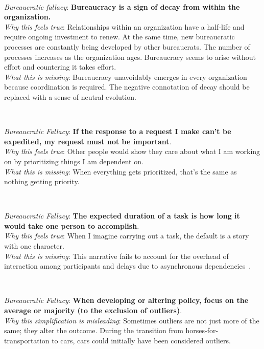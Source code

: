 \ \\
\begin{samepage}
\textit{Bureaucratic fallacy}: \textbf{Bureaucracy is a sign of decay from within the organization.} \\
\textit{Why this feels true}: Relationships within an organization have a half-life and require ongoing investment to renew. At the same time, new bureaucratic processes are constantly being developed by other bureaucrats. The number of processes increases as the organization ages. Bureaucracy seems to arise without effort and countering it takes effort.  \\
\textit{What this is missing}: Bureaucracy unavoidably emerges in every organization because coordination is required. The negative connotation of decay should be replaced with a sense of neutral evolution.
\end{samepage}

\ \\
\begin{samepage}
\textit{Bureaucratic Fallacy}: \textbf{If the response to a request I make can't be expedited, my request must not be important}.  \\
\textit{Why this feels true}: Other people would show they care about what I am working on by prioritizing things I am dependent on.\\
\textit{What this is missing}: When everything gets prioritized, that's the same as nothing getting priority.
\end{samepage}

\ \\
\begin{samepage}
\textit{Bureaucratic Fallacy}: \textbf{The expected duration of a task is how long it would take one person to accomplish}.  \\
\textit{Why this feels true}: When I imagine carrying out a task, the default is a story with one character. \\
\textit{What this is missing}: This narrative fails to account for the overhead of interaction among participants and delays due to asynchronous dependencies~\cite{1975_brooks}.
\end{samepage}

\ \\
\begin{samepage}
\textit{Bureaucratic Fallacy}: \textbf{When developing or altering policy, focus on the average or majority (to the exclusion of outliers)}. \\
\textit{Why this simplification is misleading}: Sometimes outliers are not just more of the same; they alter the outcome. During the transition from horses-for-transportation to cars, cars could initially have been considered outliers. 
\end{samepage}

